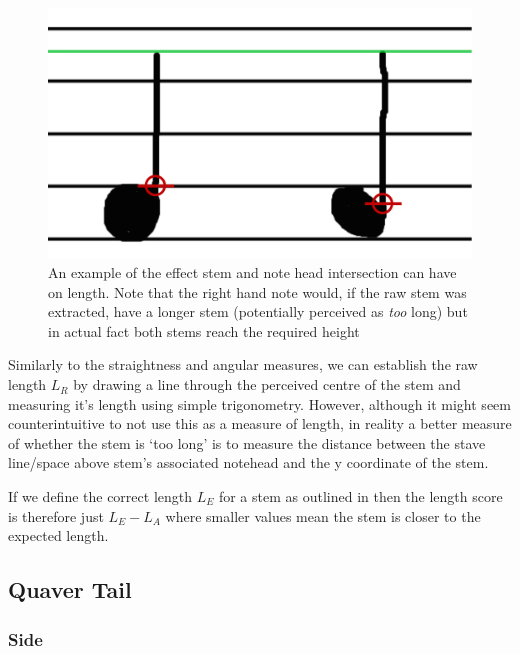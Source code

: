 \begin{figure}[h!]
    \centering
    \includegraphics[width=.8\textwidth]{gfx/techniques/stem-intersection-labelled.png}
    \caption{An example of the effect stem and note head intersection can have on length. Note that the right hand note would, if the raw stem was extracted, have a longer stem (potentially perceived as \emph{too} long) but in actual fact both stems reach the required height}
    \label{fig:stem-intersection}
\end{figure}

Similarly to the straightness and angular measures, we can establish the raw length $L_R$ by drawing a line through the perceived centre of the stem and measuring it's length using simple trigonometry. However, although it might seem counterintuitive to not use this as a measure of length, in reality a better measure of whether the stem is `too long' is to measure the distance between the stave line/space above stem's associated notehead and the y coordinate of the stem.

If we define the correct length $L_E$ for a stem as outlined in  then the length score is therefore just $L_E - L_A$ where smaller values mean the stem is closer to the expected length.

\subsection{Quaver Tail}

\subsubsection{Side}


